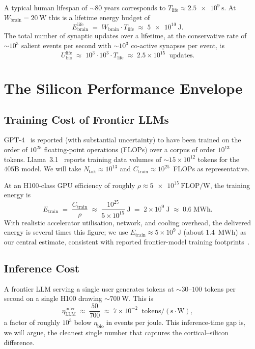 \documentclass[11pt]{article}
\providecommand{\watt}{\ensuremath{\mathrm{W}}}
\providecommand{\joule}{\ensuremath{\mathrm{J}}}
\providecommand{\second}{\ensuremath{\mathrm{s}}}
\providecommand{\flop}{\ensuremath{\mathrm{FLOP}}}
\providecommand{\per}{\ensuremath{/}}
\theoremstyle{definition}
\theoremstyle{remark}
\newcommand{\Wbrain}{W_{\mathrm{brain}}}
\newcommand{\Ebrain}{E_{\mathrm{brain}}}
\newcommand{\Tlife}{T_{\mathrm{life}}}
\newcommand{\Etrain}{E_{\mathrm{train}}}
\begin{document}
A typical human lifespan of $\sim\!80$ years corresponds to
$\Tlife\approx \SI{2.5e9}{\second}$.  At $\Wbrain = \SI{20}{\watt}$
this is a lifetime energy budget of
\[
  \Ebrain^{\mathrm{life}} \;=\; \Wbrain \cdot \Tlife
  \;\approx\; \SI{5e10}{\joule}.
\]
The total number of synaptic updates over a lifetime, at the
conservative rate of $\sim\!10^{3}$ salient events per second with
$\sim\!10^{3}$ co-active synapses per event, is
\[
  U_{\mathrm{bio}}^{\mathrm{life}} \;\approx\;
  10^{3}\cdot 10^{3} \cdot \Tlife \;\approx\; 2.5\times 10^{15}
  \;\;\text{updates}.
\]

\section{The Silicon Performance Envelope}
\label{sec:silicon}

\subsection{Training Cost of Frontier LLMs}

GPT-4~\cite{openai2023gpt4} is reported (with substantial
uncertainty) to have been trained on the order of $10^{25}$
floating-point operations (FLOPs) over a corpus of order
$10^{13}$ tokens.  Llama~3.1~\cite{meta2024llama31} reports training
data volumes of $\sim\!15\times 10^{12}$ tokens for the $405\mathrm{B}$
model.  We will take $N_{\mathrm{tok}}\approx 10^{13}$ and
$C_{\mathrm{train}}\approx 10^{25}$~FLOPs as representative.

At an H100-class GPU efficiency of roughly
$\rho \approx \SI{5e15}{\flop\per\watt}$, the training energy is
\[
  \Etrain \;=\; \frac{C_{\mathrm{train}}}{\rho}
  \;\approx\; \frac{10^{25}}{5\times 10^{15}}\;\si{\joule}
  \;=\; 2\times 10^{9}\;\si{\joule}
  \;\approx\; 0.6\;\mathrm{MWh}.
\]
With realistic accelerator utilisation, network, and cooling overhead,
the delivered energy is several times this figure; we use
$\Etrain \approx 5\times 10^{9}\;\si{\joule}$ (about \SI{1.4}{MWh}) as
our central estimate, consistent with reported frontier-model
training footprints~\cite{patterson2021carbon}.

\subsection{Inference Cost}
\label{sec:inference}

A frontier LLM serving a single user generates tokens at
$\sim\!30$--$100$ tokens per second on a single H100 drawing
$\sim\!\SI{700}{\watt}$.  This is
\[
  \eta_{\mathrm{LLM}}^{\mathrm{infer}}
  \;\approx\; \frac{50}{700}
  \;\approx\; 7\times 10^{-2}\;\;\mathrm{tokens}/(\mathrm{s}\cdot\mathrm{W}),
\]
a factor of roughly $10^{3}$ below $\eta_{\mathrm{bio}}$ in events
per joule.  This inference-time gap is, we will argue, the cleanest
single number that captures the cortical--silicon difference.
\end{document}
